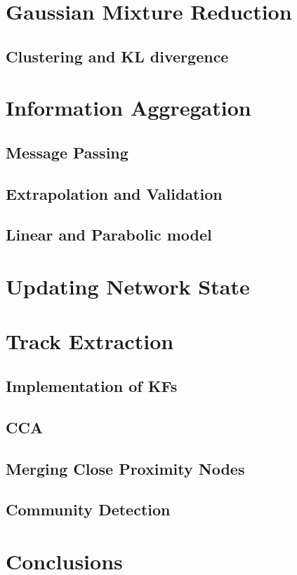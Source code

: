 \section{Gaussian Mixture Reduction}
\subsection{Clustering and KL divergence}

\section{Information Aggregation}
\subsection{Message Passing}
\subsection{Extrapolation and Validation}
\subsection{Linear and Parabolic model}

\section{Updating Network State}

\section{Track Extraction}
\subsection{Implementation of KFs}
\subsection{CCA}
\subsection{Merging Close Proximity Nodes}
\subsection{Community Detection}



\section{Conclusions}
